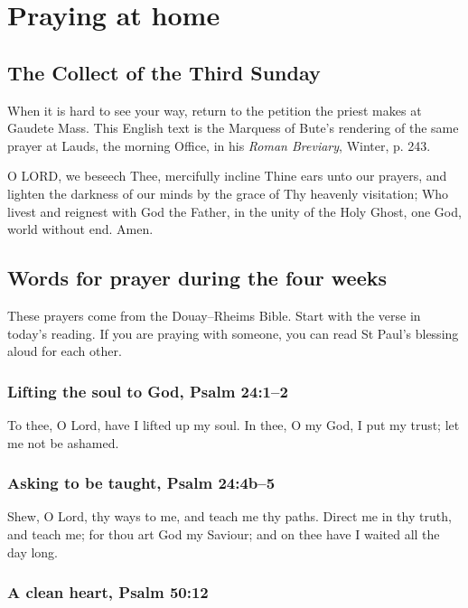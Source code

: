\section{Praying at home}
\label{sec:advent-home-prayers}

\subsection{The Collect of the Third Sunday}
\label{sec:advent-gaudete-collect}

When it is hard to see your way, return to the petition the priest makes
at Gaudete Mass. This English text is the Marquess of Bute's rendering
of the same prayer at Lauds, the morning Office, in his \emph{Roman
Breviary}, Winter, p. 243.

O LORD, we beseech Thee, mercifully incline Thine ears unto our prayers, and lighten the darkness of our minds by the grace of Thy heavenly visitation; Who livest and reignest with God the Father, in the unity of the Holy Ghost, one God, world without end. Amen.

\subsection{Words for prayer during the four weeks}

These prayers come from the Douay--Rheims Bible. Start with the verse
in today's reading. If you are praying with someone, you can read
St Paul's blessing aloud for each other.

\subsubsection*{Lifting the soul to God, Psalm 24:1--2}

To thee, O Lord, have I lifted up my soul. In thee, O my God, I put my trust; let me not be ashamed.

\subsubsection*{Asking to be taught, Psalm 24:4b--5}

Shew, O Lord, thy ways to me, and teach me thy paths. Direct me in thy truth, and teach me; for thou art God my Saviour; and on thee have I waited all the day long.

\subsubsection*{A clean heart, Psalm 50:12}

